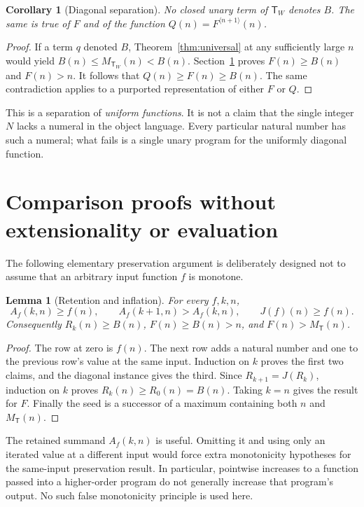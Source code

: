 \documentclass[11pt]{article}
\newtheorem{lemma}[theorem]{Lemma}
\newtheorem{corollary}[theorem]{Corollary}
\theoremstyle{definition}
\newcommand{\T}{\mathsf T}
\newcommand{\TW}{\mathsf T_W}
\newcommand{\MT}{M_{\T}}
\newcommand{\MW}{M_{\TW}}
\newcommand{\itf}[3]{#1^{\langle #2\rangle}(#3)}
\begin{document}
\begin{corollary}[Diagonal separation]\label{cor:separation}
No closed unary term of $\TW$ denotes $B$. The same is true of $F$ and of the
function $Q(n)=\itf F{n+1}n$.
\end{corollary}
\begin{proof}
If a term $q$ denoted $B$, Theorem~\ref{thm:universal} at any sufficiently large
$n$ would yield $B(n)\le\MW(n)<B(n)$. Section~\ref{sec:comparison} proves
$F(n)\ge B(n)$ and $F(n)>n$. It follows that $Q(n)\ge F(n)\ge B(n)$.
The same contradiction applies to a purported representation of either $F$ or
$Q$.
\end{proof}
This is a separation of \emph{uniform functions}. It is not a claim that the
single integer $N$ lacks a numeral in the object language. Every particular
natural number has such a numeral; what fails is a single unary program for
the uniformly diagonal function.

\section{Comparison proofs without extensionality or evaluation}
\label{sec:comparison}
The following elementary preservation argument is deliberately designed not to
assume that an arbitrary input function $f$ is monotone.

\begin{lemma}[Retention and inflation]\label{lem:retention}
For every $f,k,n$,
\[
 A_f(k,n)\ge f(n),\qquad A_f(k+1,n)>A_f(k,n),\qquad J(f)(n)\ge f(n).
\]
Consequently $R_k(n)\ge B(n)$, $F(n)\ge B(n)>n$, and $F(n)>\MT(n)$.
\end{lemma}
\begin{proof}
The row at zero is $f(n)$. The next row adds a natural number and one to the
previous row's value at the same input. Induction on $k$ proves the first two
claims, and the diagonal instance gives the third. Since $R_{k+1}=J(R_k)$,
induction on $k$ proves $R_k(n)\ge R_0(n)=B(n)$. Taking $k=n$ gives the result for
$F$. Finally the seed is a successor of a maximum containing both $n$ and
$\MT(n)$.
\end{proof}
The retained summand $A_f(k,n)$ is useful. Omitting it and using only an iterated
value at a different input would force extra monotonicity hypotheses for the
same-input preservation result. In particular, pointwise increases to a function
passed into a higher-order program do not generally increase that program's
output. No such false monotonicity principle is used here.
\end{document}
